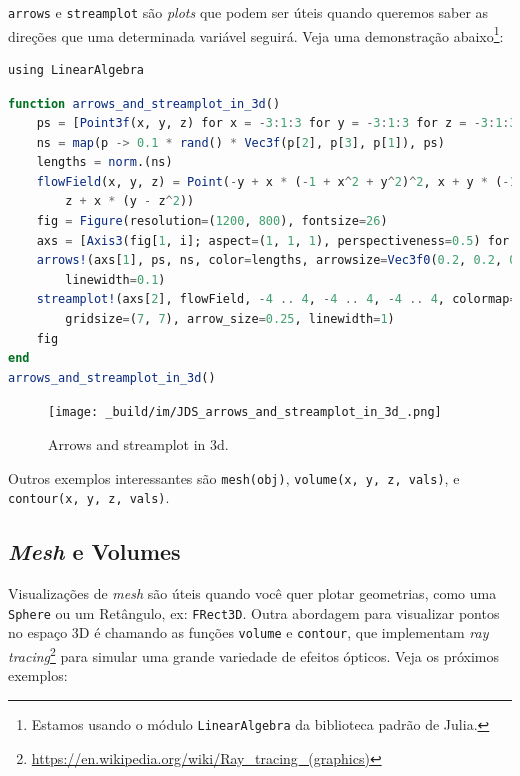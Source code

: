 \documentclass[
  notoc %
]{tufte-book}
\DeclareRobustCommand{\href}[2]{#2\footnote{\url{#1}}}
\newcommand{\passthrough}[1]{#1}
\begin{document}
\passthrough{\lstinline!arrows!} e \passthrough{\lstinline!streamplot!}
são \emph{plots} que podem ser úteis quando queremos saber as direções
que uma determinada variável seguirá. Veja uma demonstração
abaixo\footnote{Estamos usando o módulo
  \passthrough{\lstinline!LinearAlgebra!} da biblioteca padrão de Julia.}:

\begin{lstlisting}
using LinearAlgebra
\end{lstlisting}

\begin{lstlisting}[language=Julia]
function arrows_and_streamplot_in_3d()
    ps = [Point3f(x, y, z) for x = -3:1:3 for y = -3:1:3 for z = -3:1:3]
    ns = map(p -> 0.1 * rand() * Vec3f(p[2], p[3], p[1]), ps)
    lengths = norm.(ns)
    flowField(x, y, z) = Point(-y + x * (-1 + x^2 + y^2)^2, x + y * (-1 + x^2 + y^2)^2,
        z + x * (y - z^2))
    fig = Figure(resolution=(1200, 800), fontsize=26)
    axs = [Axis3(fig[1, i]; aspect=(1, 1, 1), perspectiveness=0.5) for i = 1:2]
    arrows!(axs[1], ps, ns, color=lengths, arrowsize=Vec3f0(0.2, 0.2, 0.3),
        linewidth=0.1)
    streamplot!(axs[2], flowField, -4 .. 4, -4 .. 4, -4 .. 4, colormap=:plasma,
        gridsize=(7, 7), arrow_size=0.25, linewidth=1)
    fig
end
arrows_and_streamplot_in_3d()
\end{lstlisting}

\begin{figure}
\hypertarget{fig:arrows_and_streamplot_in_3d}{%
\centering
\texttt{[image: \_build/im/JDS\_arrows\_and\_streamplot\_in\_3d\_.png]}
\caption{Arrows and streamplot in
3d.}\label{fig:arrows_and_streamplot_in_3d}
}
\end{figure}

Outros exemplos interessantes são \passthrough{\lstinline!mesh(obj)!},
\passthrough{\lstinline!volume(x, y, z, vals)!}, e
\passthrough{\lstinline!contour(x, y, z, vals)!}.

\hypertarget{mesh-e-volumes}{%
\subsection{\texorpdfstring{\emph{Mesh} e
Volumes}{Mesh e Volumes}}\label{mesh-e-volumes}}

Visualizações de \emph{mesh} são úteis quando você quer plotar
geometrias, como uma \passthrough{\lstinline!Sphere!} ou um Retângulo,
ex: \passthrough{\lstinline!FRect3D!}. Outra abordagem para visualizar
pontos no espaço 3D é chamando as funções
\passthrough{\lstinline!volume!} e \passthrough{\lstinline!contour!},
que implementam
\href{https://en.wikipedia.org/wiki/Ray_tracing_(graphics)}{\emph{ray
tracing}} para simular uma grande variedade de efeitos ópticos. Veja os
próximos exemplos:
\end{document}
